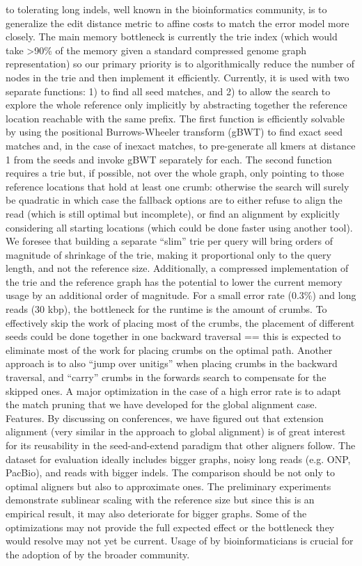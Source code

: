 to tolerating long indels, well known in the bioinformatics community, is to
generalize the edit distance metric to affine costs to match the error model
more closely. The main memory bottleneck is currently the trie index (which
would take >90\% of the memory given a standard compressed genome graph
representation) so our primary priority is to algorithmically reduce the number
of nodes in the trie and then implement it efficiently. Currently, it is used
with two separate functions: 1) to find all seed matches, and 2) to allow the
search \A to explore the whole reference only implicitly by abstracting together
the reference location reachable with the same prefix. The first function is
efficiently solvable by using the positional Burrows-Wheeler transform (gBWT) to
find exact seed matches and, in the case of inexact matches, to pre-generate all
kmers at distance 1 from the seeds and invoke gBWT separately for each. The
second function requires a trie but, if possible, not over the whole graph, only
pointing to those reference locations that hold at least one crumb: otherwise
the \A search will surely be quadratic in which case the fallback options are to
either refuse to align the read (which is still optimal but incomplete), or find
an alignment by explicitly considering all starting locations (which could be
done faster using another tool). We foresee that building a separate “slim” trie
per query will bring orders of magnitude of shrinkage of the trie, making it
proportional only to the query length, and not the reference size. Additionally,
a compressed implementation of the trie and the reference graph has the
potential to lower the current memory usage by an additional order of magnitude.
For a small error rate (0.3\%) and long reads (30 kbp), the bottleneck for the
runtime is the amount of crumbs. To effectively skip the work of placing most of
the crumbs, the placement of different seeds could be done together in one
backward traversal == this is expected to eliminate most of the work for placing
crumbs on the optimal path.  Another approach is to also ``jump over unitigs''
when placing crumbs in the backward traversal, and ``carry'' crumbs in the
forwards \A search to compensate for the skipped ones. A major optimization in
the case of a high error rate is to adapt the match pruning that we have
developed for the global alignment case. Features. By discussing \astarix on
conferences, we have figured out that extension alignment (very similar in the
approach to global alignment) is of great interest for its reusability in the
seed-and-extend paradigm that other aligners follow. The dataset for evaluation
ideally includes bigger graphs, noisy long reads (e.g. ONP, PacBio), and reads
with bigger indels. The comparison should be not only to optimal aligners but
also to approximate ones. The preliminary experiments demonstrate sublinear
scaling with the reference size but since this is an empirical result, it may
also deteriorate for bigger graphs. Some of the optimizations may not provide
the full expected effect or the bottleneck they would resolve may not yet be
current. Usage of \astarix by bioinformaticians is crucial for the adoption of
\astarix by the broader community.

